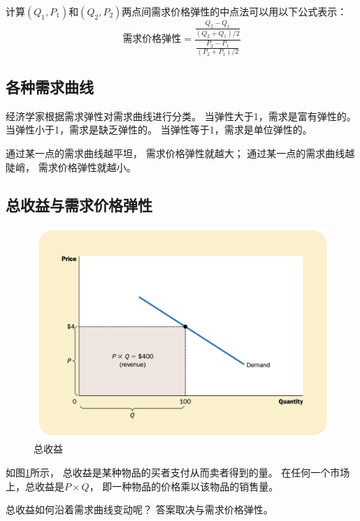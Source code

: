 计算$(Q_1,P_1)$和$(Q_2,P_2)$两点间需求价格弹性的中点法可以用以下公式表示：
\begin{equation}
  \text{需求价格弹性} =
  \frac{
    \frac{Q_2-Q_1}{(Q_2+Q_1)/2}
  }{
    \frac{P_2-P_1}{(P_2+P_1)/2}
  }
\end{equation}


\subsection{各种需求曲线}

经济学家根据需求弹性对需求曲线进行分类。
当弹性大于1，需求是富有弹性的。
当弹性小于1，需求是缺乏弹性的。
当弹性等于1，需求是单位弹性的。



通过某一点的需求曲线越平坦，
需求价格弹性就越大；
通过某一点的需求曲线越陡峭，
需求价格弹性就越小。



\subsection{总收益与需求价格弹性}

\begin{figure}[!ht]
  \centering
  \includegraphics[width=\textwidth]{pics/total-revenue}
  \caption{总收益}
  \label{fig:total-revenue}
\end{figure}
如图\ref{fig:total-revenue}所示，
总收益是某种物品的买者支付从而卖者得到的量。
在任何一个市场上，总收益是$P\times Q$，
即一种物品的价格乘以该物品的销售量。


总收益如何沿着需求曲线变动呢？
答案取决与需求价格弹性。

